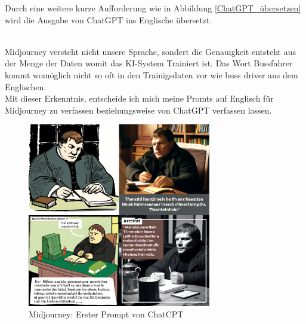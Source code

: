 Durch eine weitere kurze Aufforderung wie in Abbildung \ref{ChatGPT_übersetzen} wird die Ausgabe von ChatGPT ins Englische übersetzt.

\\
Midjourney versteht nicht unsere Sprache, sondert die Genauigkeit entsteht aus der Menge der Daten womit das KI-System Trainiert ist. Das Wort Bussfahrer kommt womöglich nicht so oft in den Trainigsdaten vor wie buss driver aus dem Englischen.
\\
Mit dieser Erkenntnis, entscheide ich mich meine Promts auf Englisch für Midjourney zu verfassen beziehungsweise von ChatGPT verfassen lassen.
\begin{figure}[h]
	\centering
	\includegraphics[width=8.022cm]{BilderFuerBA/MLaufEnglisch.png}
	\caption{Midjourney: Erster Prompt von ChatCPT}
	\label{Midjourney_erster_Prompt}
\end{figure}
